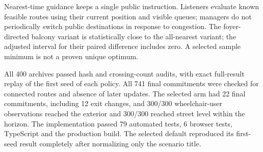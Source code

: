 Nearest-time guidance keeps a single public instruction. Listeners evaluate known feasible routes using their current position and visible queues; managers do not periodically switch public destinations in response to congestion. The foyer-directed balcony variant is statistically close to the all-nearest variant; the adjusted interval for their paired difference includes zero. A selected sample minimum is not a proven unique optimum.

All 400 archives passed hash and crossing-count audits, with exact full-result replay of the first seed of each policy. All 741 final commitments were checked for connected routes and absence of later updates. The selected arm had 22 final commitments, including 12 exit changes, and 300/300 wheelchair-user observations reached the exterior and 300/300 reached street level within the horizon. The implementation passed 79 automated tests, 6 browser tests, TypeScript and the production build. The selected default reproduced its first-seed result completely after normalizing only the scenario title.
